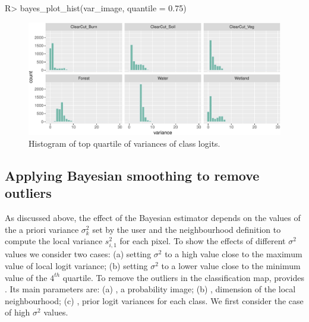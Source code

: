 \documentclass[
  shortnames]{jss}
\begin{document}
\begin{CodeChunk}
\begin{CodeInput}
R> bayes_plot_hist(var_image, quantile = 0.75)
\end{CodeInput}
\begin{figure}[h]

{\centering \includegraphics{Bayesian_smoothing_JSS_files/figure-latex/vhist-1} 

}

\caption[Histogram of top quartile of variances of class logits]{Histogram of top quartile of variances of class logits.}\label{fig:vhist}
\end{figure}
\end{CodeChunk}

\hypertarget{applying-bayesian-smoothing-to-remove-outliers}{%
\subsection{Applying Bayesian smoothing to remove outliers}\label{applying-bayesian-smoothing-to-remove-outliers}}

As discussed above, the effect of the Bayesian estimator depends on the values of the a priori variance \(\sigma^2_{k}\) set by the user and the neighbourhood definition to compute the local variance \(s^2_{i,1}\) for each pixel. To show the effects of different \(\sigma^2\) values we consider two cases: (a) setting \(\sigma^2\) to a high value close to the maximum value of local logit variance; (b) setting \(\sigma^2\) to a lower value close to the minimum value of the \(4^{th}\) quartile. To remove the outliers in the classification map,  provides . Its main parameters are: (a) , a probability image; (b) , dimension of the local neighbourhood; (c) , prior logit variances for each class. We first consider the case of high \(\sigma^2\) values.
\end{document}
